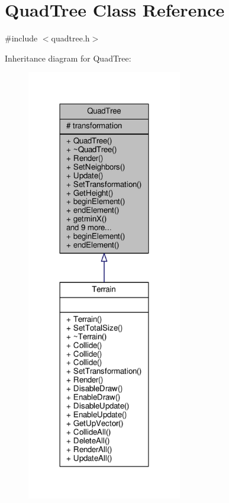 \hypertarget{classQuadTree}{}\section{Quad\+Tree Class Reference}
\label{classQuadTree}


{\ttfamily \#include $<$quadtree.\+h$>$}



Inheritance diagram for Quad\+Tree\+:
\nopagebreak
\begin{figure}[H]
\begin{center}
\leavevmode
\includegraphics[width=192pt]{df/d2f/classQuadTree__inherit__graph}
\end{center}
\end{figure}


